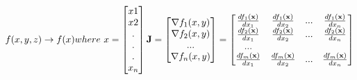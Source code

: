 \documentclass{article}
\begin{document}
\begin{math}
    f(x,y,z) \rightarrow f(x) where\  x = 
    \begin{bmatrix}
        x1\\x2\\.\\.\\.\\x_n
    \end{bmatrix}\\
    \textbf{J}= 
    \begin{bmatrix}
        \nabla f_1(x,y)\\
        \nabla f_2(x,y)\\
        ...\\
        \nabla f_n(x,y)\\
    \end{bmatrix}
    = \begin{bmatrix}
        \frac{df_1(\textbf{x})}{dx_1} & \frac{df_1(\textbf{x})}{dx_2} & ... & \frac{df_1(\textbf{x})}{dx_n} \\
        \frac{df_2(\textbf{x})}{dx_1} & \frac{df_2(\textbf{x})}{dx_2} & ... & \frac{df_2(\textbf{x})}{dx_n} \\
        ...\\
        \frac{df_m(\textbf{x})}{dx_1} & \frac{df_m(\textbf{x})}{dx_2} & ... & \frac{df_m(\textbf{x})}{dx_n} \\
    \end{bmatrix}
\end{math}
\end{document}
